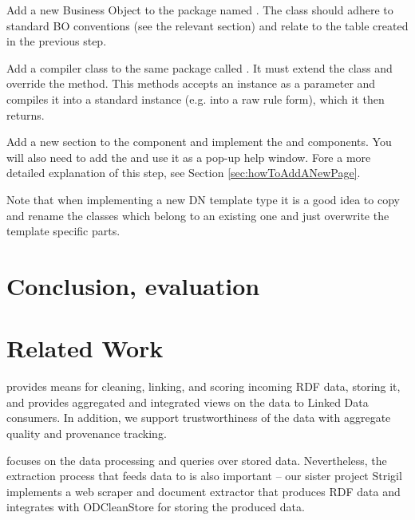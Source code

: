 Add a new Business Object to the  package named . The class should adhere to standard BO conventions (see the relevant section) and relate to the table created in the previous step.

Add a compiler class to the same package called . It must extend the  class and override the  method. This methods accepts an  instance as a parameter and compiles it into a standard  instance (e.g. into a raw rule form), which it then returns.

Add a new section to the  component and implement the \linebreak{} and  components. You will also need to add the  and use it as a pop-up help window. Fore a more detailed explanation of this step, see Section \ref{sec:howToAddANewPage}.

Note that when implementing a new DN template type it is a good idea to copy and rename the classes which belong to an existing one and just overwrite the template specific parts.


\chapter{Conclusion, evaluation}


\chapter{Related Work}
\odcs provides means for cleaning, linking, and scoring incoming RDF data, storing it, and provides aggregated and integrated views on the data to Linked Data consumers. In addition, we support trustworthiness of the data with aggregate quality and provenance tracking. 

\odcs focuses on the data processing and queries over stored data. Nevertheless, the extraction process that feeds data to  \odcs is also important -- our sister project Strigil implements a web scraper and document extractor that produces RDF data and integrates with ODCleanStore for storing the produced data.

